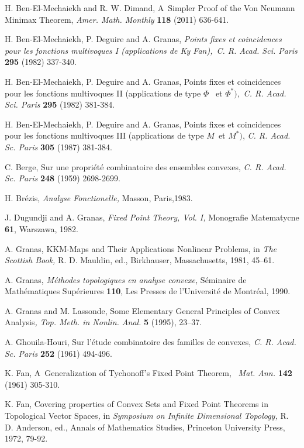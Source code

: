 \documentclass{article}
\begin{document}
\begin{thebibliography}{99}
 H. Ben-El-Mechaiekh and R. W. Dimand, A\ Simpler Proof of the
Von Neumann Minimax Theorem, \textit{Amer. Math. Monthly} \textbf{118}
(2011) 636-641.

 H. Ben-El-Mechaiekh, P. Deguire and A. Granas, \textit{Points
fixes et coincidences pour les fonctions multivoques I (applications de Ky
Fan),}\ \textit{C. R. Acad. Sci. Paris} \textbf{295} (1982) 337-340.

 H. Ben-El-Mechaiekh, P. Deguire and A. Granas, Points fixes et
coincidences pour les fonctions multivoques II (applications de type $\Phi $%
\ et $\Phi ^{\ast }),$ \textit{C. R. Acad. Sci. Paris} \textbf{295} (1982)
381-384.

 H. Ben-El-Mechaiekh, P. Deguire and A. Granas, Points fixes et
coincidences pour les fonctions multivoques III (applications de type $M$\
et $M^{\ast })$, \textit{C. R. Acad. Sc. Paris} \textbf{305} (1987) 381-384.

 C. Berge, Sur une propri\'{e}t\'{e} combinatoire des ensembles
convexes, \textit{C. R. Acad. Sc. Paris} \textbf{248} (1959) 2698-2699.

 H. Br\'{e}zis, \textit{Analyse Fonctionelle,} Masson, Paris,1983.

 J. Dugundji and A. Granas, \textit{Fixed Point Theory, Vol. I,}
Monografie Matematycne \textbf{61}, Warszawa, 1982.

 A. Granas, KKM-Maps and Their Applications Nonlinear Problems,
in \textit{The Scottish Book,} R. D. Mauldin, ed., Birkhauser,
Massachusetts, 1981, 45--61.

 A. Granas, \textit{M\'{e}thodes topologiques en analyse convexe,}
S\'{e}minaire de Math\'{e}matiques Sup\'{e}rieures \textbf{110}, Les Presses
de l'Universit\'{e} de Montr\'{e}al, 1990.

 A. Granas and M. Lassonde, Some Elementary General Principles
of Convex Analysis\textit{,} \textit{Top. Meth. in Nonlin. Anal. }\textbf{5}
(1995), 23--37.

 A. Ghouila-Houri, Sur l'\'{e}tude combinatoire des familles de
convexes, \textit{C. R. Acad. Sc. Paris} \textbf{252} (1961) 494-496.

 K. Fan, A\ Generalization of Tychonoff's Fixed Point Theorem,%
\textit{\ Mat. Ann.} \textbf{142} (1961) 305-310.

 K. Fan, Covering properties of Convex Sets and Fixed Point
Theorems in Topological Vector Spaces\textit{,} in \textit{Symposium on
Infinite Dimensional Topology,} R. D. Anderson, ed., Annals of Mathematics
Studies, Princeton University Press, 1972, 79-92.


\end{thebibliography}
\end{document}
